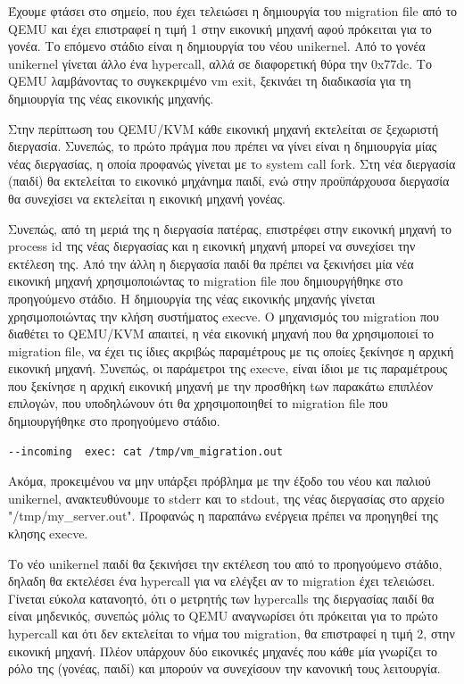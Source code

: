 Έχουμε φτάσει στο σημείο, που έχει τελειώσει η δημιουργία του migration file από
το QEMU και έχει επιστραφεί η τιμή 1 στην εικονική μηχανή αφού πρόκειται για το
γονέα. Το επόμενο στάδιο είναι η δημιουργία του νέου unikernel. Από το γονέα
unikernel γίνεται άλλο ένα hypercall, αλλά σε διαφορετική θύρα την 0x77dc. Το
QEMU λαμβάνοντας το συγκεκριμένο vm exit, ξεκινάει τη διαδικασία για τη
δημιουργία της νέας εικονικής μηχανής. 

Στην περίπτωση του QEMU/KVM κάθε εικονική μηχανή εκτελείται σε ξεχωριστή
διεργασία. Συνεπώς, το πρώτο πράγμα που πρέπει να γίνει είναι η δημιουργία μίας
νέας διεργασίας, η οποία προφανώς γίνεται με τo system call fork. Στη νέα
διεργασία (παιδί) θα εκτελείται το εικονικό μηχάνημα παιδί, ενώ στην
προϋπάρχουσα διεργασία θα συνεχίσει να εκτελείται η εικονική μηχανή γονέας.

Συνεπώς, από τη μεριά της η διεργασία πατέρας, επιστρέφει στην εικονική μηχανή
το process id της νέας διεργασίας και η εικονική μηχανή μπορεί να συνεχίσει την
εκτέλεση της. Από την άλλη η διεργασία παιδί θα πρέπει να ξεκινήσει μία νέα
εικονική μηχανή χρησιμοποιώντας το migration file που δημιουργήθηκε στο
προηγούμενο στάδιο. Η δημιουργία της νέας εικονικής μηχανής γίνεται
χρησιμοποιώντας την κλήση συστήματος execve. Ο μηχανισμός του migration που
διαθέτει το QEMU/KVM απαιτεί, η νέα εικονική μηχανή που θα χρησιμοποιεί το
migration file, να έχει τις ίδιες ακριβώς παραμέτρους με τις οποίες ξεκίνησε η
αρχική εικονική μηχανή. Συνεπώς, οι παράμετροι της execve, είναι ίδιοι με τις
παραμέτρους που ξεκίνησε η αρχική εικονική μηχανή με την προσθήκη tων παρακάτω
επιπλέον επιλογών, που υποδηλώνουν ότι θα χρησιμοποιηθεί το migration file που
δημιουργήθηκε στο προηγούμενο στάδιο.

\begin{lstlisting}[numbers=none]
--incoming  exec: cat /tmp/vm_migration.out 
\end{lstlisting}

Ακόμα, προκειμένου να μην υπάρξει πρόβλημα με την έξοδο του νέου και παλιού
unikernel, ανακτευθύνουμε το stderr και το stdout, της νέας διεργασίας στο
αρχείο "/tmp/my\_server.out". Προφανώς η παραπάνω ενέργεια πρέπει να προηγηθεί
της κλησης execve. 

Το νέο unikernel παιδί θα ξεκινήσει την εκτέλεση του από το προηγούμενο στάδιο,
δηλαδη θα εκτελέσει ένα hypercall για να ελέγξει αν το migration έχει τελειώσει.
Γίνεται εύκολα κατανοητό, ότι ο μετρητής των hypercalls της διεργασίας παιδί θα
είναι μηδενικός, συνεπώς μόλις το QEMU αναγνωρίσει ότι πρόκειται για το πρώτο
hypercall και ότι δεν εκτελείται το νήμα του migration, θα επιστραφεί η τιμή 2,
στην εικονική μηχανή. Πλέον υπάρχουν δύο εικονικές μηχανές που κάθε μία γνωρίζει
το ρόλο της (γονέας, παιδί) και μπορούν να συνεχίσουν την κανονική τους λειτουργία.

